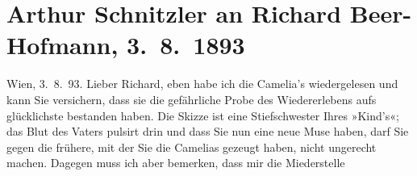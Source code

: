 

         
         \renewcommand{\erwaehntePersonen}{Personen: Richard Beer-Hofmann, Otto Erich Hartleben, Felix Salten}
         \renewcommand{\erwaehnteOrte}{Orte: Bad Ischl, Schulgasse, Wien}
         \renewcommand{\erwaehnteWerke}{Werke: Camelias, Das Kind, Der Tod Georgs, Die Erziehung zur Ehe, Die kleine Komödie, Novellen}
               \section[Arthur Schnitzler an Richard Beer-Hofmann, 3. 8. 1893]{ Arthur Schnitzler an Richard Beer-Hofmann, 3. 8. 1893}\nopagebreak{}\rehead{ }\begin{ledgroupsized}[t]{13cm}\normalsize\beginnumbering \toendnotes[C]{\smallbreak\pagebreak[2]} 
\toendnotes[C]{\smallbreak}\pstart
           \raggedleft{}{\pb}Wien, 3. 8. 93.\pend
           \pstart
           Lieber Richard, eben habe ich die Camelia’s wiedergelesen und kann Sie versichern, dass sie die gefährliche
               Probe des Wiedererlebens aufs glücklichste bestanden haben. Die Skizze ist eine
               Stiefschwester Ihres »Kind’s«; das Blut des
               Vaters pulsirt drin und dass Sie nun eine neue Muse haben, darf Sie gegen die
               frühere, mit der Sie die Camelias gezeugt haben,
               nicht ungerecht machen. Dagegen muss ich aber bemerken, dass mir die Miederstelle

\end{ledgroupsized}
